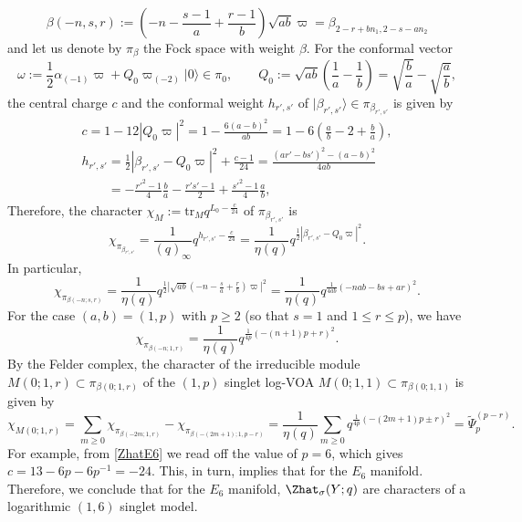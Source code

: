 \documentclass[10pt,a4paper]{amsart}
\begin{document}
\begin{Example}
\[
\beta(-n, s, r) := \left( -n - \frac{s-1}{a} + \frac{r-1}{b} \right) \sqrt{ab}\varpi = \beta_{2-r+bn_1, 2-s-an_2}
\]
and let us denote by $\pi_\beta$ the Fock space with weight $\beta$. For the conformal vector
\[
\omega := \frac{1}{2}\alpha_{(-1)} \varpi + Q_0 \varpi_{(-2)} |0\rangle \in \pi_0, \qquad Q_0 := \sqrt{ab}\left(\frac{1}{a} - \frac{1}{b}\right) = \sqrt{\frac{b}{a}} - \sqrt{\frac{a}{b}},
\]
the central charge $c$ and the conformal weight $h_{r',s'}$ of $|\beta_{r',s'}\rangle \in \pi_{\beta_{r',s'}}$ is given by
\begin{gather*}
c = 1 - 12|Q_0 \varpi|^2 = 1 - \frac{6(a-b)^2}{ab} = 1 - 6\left( \frac{a}{b} - 2 + \frac{b}{a} \right),
\\
h_{r',s'} = \frac{1}{2} |\beta_{r',s'} - Q_0 \varpi|^2 + \frac{c-1}{24} = \frac{(ar'-bs')^2-(a-b)^2}{4ab}
\\
\phantom{h_{r',s'} }{}
= - \frac{r'^2-1}{4}\frac{b}{a} - \frac{r's'-1}{2}+ \frac{s'^2-1}{4}\frac{a}{b},
\end{gather*}
Therefore, the character $\chi_M := \text{tr}_M q^{L_0 - \frac{c}{24}}$ of $\pi_{\beta_{r',s'}}$ is
\[
\chi_{\pi_{\beta_{r',s'}}} = \frac{1}{(q)_\infty} q^{h_{r',s'} - \frac{c}{24}} = \frac{1}{\eta(q)} q^{\frac{1}{2}|\beta_{r',s'} - Q_0 \varpi|^2}.
\]
In particular,
\[
\chi_{\pi_{\beta(-n;s,r)}} = \frac{1}{\eta(q)} q^{\frac{1}{2}|\sqrt{ab}(-n-\frac{s}{a}+\frac{r}{b})\varpi|^2} = \frac{1}{\eta(q)} q^{\frac{1}{4 a b}(-nab-bs+ar)^2}.
\]
For the case $(a,b) = (1,p)$ with $p \geq 2$ (so that $s = 1$ and $1 \leq r \leq p$), we have
\[
\chi_{\pi_{\beta(-n;1,r)}} = \frac{1}{\eta(q)} q^{\frac{1}{4p}(-(n+1)p+r)^2}.
\]
By the Felder complex, the character of the irreducible module $M(0; 1, r) \subset \pi_{\beta(0;1,r)}$ of the $(1, p)$ singlet log-VOA $M(0; 1, 1) \subset \pi_{\beta(0;1,1)}$ is given by
\[
\chi_{M(0;1,r)} = \sum_{m \geq 0} \chi_{\pi_{\beta(-2m;1,r)}} - \chi_{\pi_{\beta(-(2m+1);1,p-r)}} = \frac{1}{\eta(q)} \sum_{m \geq 0} q^{\frac{1}{4p}(-(2m+1)p \pm r)^2} = \tilde{\Psi}_p^{(p-r)}.
\]
For example, from \eqref{ZhatE6} we read off the value of $p = 6$, which gives $c = 13 - 6p - 6p^{-1} = -24$. This, in turn, implies that  for the $E_6$ manifold.
	Therefore, we conclude that for the $E_6$ manifold, $\Zhat_{\sigma} (Y; q)$ are characters of a logarithmic $(1, 6)$ singlet model.
\end{Example}
\end{document}
